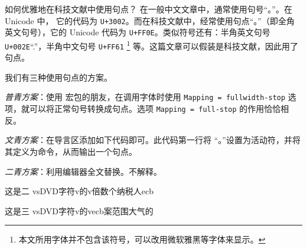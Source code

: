 \begin{myQA}{如何优雅地在科技文献中使用句点？}
	在一般中文文章中，通常使用句号“{。}”。在 Unicode 中，
	它的代码为 \verb|U+3002|。而在科技文献中，经常使用句点“。”（即全角
	英文句号），它的 Unicode 代码为 \verb|U+FF0E|。类似符号还有：半角英文句号
	\verb|U+002E|“.”，半角中文句号 \verb|U+FF61|
	\footnote{本文所用字体并不包含该符号，可以改用微软雅黑等字体来显示。}
	等。这篇文章可以假装是科技文献，因此用了句点。
	
	我们有三种使用句点的方案。
	
	\emph{普青方案}：使用  宏包的朋友，在调用字体时使用
	\verb|Mapping = fullwidth-stop| 选项，就可以将正常句号转换成句点。选项
	\verb|Mapping = full-stop| 的作用恰恰相反。
	
	\emph{文青方案}：在导言区添加如下代码即可。此代码第一行将
	“{。}”设置为活动符，并将其定义为命令，从而输出一个句点。
	
	\emph{二青方案}：利用编辑器全文替换。不解释。
	
\end{myQA}

\begin{myQA}{这是二}
	vsDVD字符v的v倍数个纳税人ecb
\end{myQA}

\begin{myQA}{这是三}
	vsDVD字符v的vecb案范围大气的
\end{myQA}